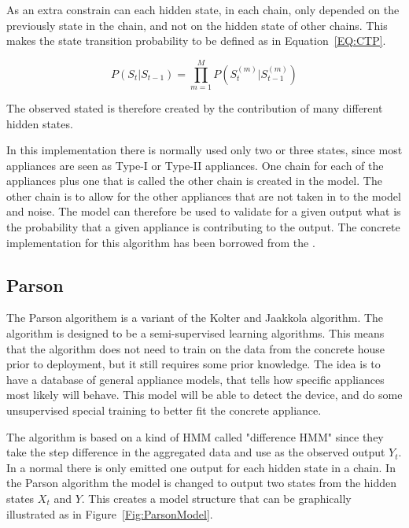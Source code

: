 As an extra constrain can each hidden state, in each chain, only depended on the previously state in the chain, and not on the hidden state of other chains. This makes the state transition probability to be defined as in Equation~\ref{EQ:CTP}. 

\begin{equation}
	P(S_t|S_{t-1}) = \prod_{m = 1}^M P\left( S_t^{(m)}| S_{t-1}^{(m)} \right)
	\label{EQ:CTP}
\end{equation}

The observed stated is therefore created by the contribution of many different hidden states. 

In this implementation there is normally used only two or three states, since most appliances are seen as Type-I or Type-II appliances. One chain for each of the appliances plus one that is called the other chain is created in the model. The other chain is to allow for the other appliances that are not taken in to the model and noise. The model can therefore be used to validate for a given output what is the probability that a given appliance is contributing to the output. The concrete implementation for this algorithm has been borrowed from the  \citep{RefWorks:21}. 

\subsection{Parson}
The Parson algorithem is a variant of the Kolter and Jaakkola algorithm\citep{RefWorks:22}. The algorithm is designed to be a semi-supervised learning algorithms. This means that the algorithm does not need to train on the data from the concrete house prior to deployment, but it still requires some prior knowledge. The idea is to have a database of general appliance models, that tells how specific appliances most likely will behave. This model will be able to detect the device, and do some unsupervised special training to better fit the concrete appliance. 

The algorithm is based on a kind of HMM called "difference HMM" since they take the step difference in the aggregated data and use as the observed output $Y_t$. In a normal  there is only emitted one output for each hidden state in a chain. In the Parson algorithm the model is changed to output two states from the hidden states $X_t$ and $Y$. This creates a model structure that can be graphically illustrated as in Figure~\ref{Fig:ParsonModel}\citep{RefWorks:28}. 

